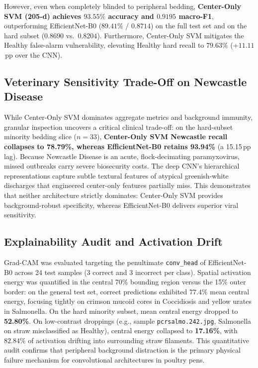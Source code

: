 \documentclass[conference]{IEEEtran}
\begin{document}
However, even when completely blinded to peripheral bedding, \textbf{Center-Only SVM (205-d) achieves $93.55\%$ accuracy and $0.9195$ macro-F1}, outperforming EfficientNet-B0 ($89.41\%$ / $0.8714$) on the full test set and on the hard subset ($0.8690$ vs.\ $0.8204$). Furthermore, Center-Only SVM mitigates the Healthy false-alarm vulnerability, elevating Healthy hard recall to $79.63\%$ ($+11.11$\,pp over the CNN).

\subsection{Veterinary Sensitivity Trade-Off on Newcastle Disease}
While Center-Only SVM dominates aggregate metrics and background immunity, granular inspection uncovers a critical clinical trade-off: on the hard-subset minority bedding slice ($n=33$), \textbf{Center-Only SVM Newcastle recall collapses to 78.79\%, whereas EfficientNet-B0 retains 93.94\%} (a 15.15\,pp lag). Because Newcastle Disease is an acute, flock-decimating paramyxovirus, missed outbreaks carry severe biosecurity costs. The deep CNN's hierarchical representations capture subtle textural features of atypical greenish-white discharges that engineered center-only features partially miss. This demonstrates that neither architecture strictly dominates: Center-Only SVM provides background-robust specificity, whereas EfficientNet-B0 delivers superior viral sensitivity.

\subsection{Explainability Audit and Activation Drift}
Grad-CAM was evaluated targeting the penultimate \texttt{conv\_head} of EfficientNet-B0 across 24 test samples (3 correct and 3 incorrect per class). Spatial activation energy was quantified in the central 70\% bounding region versus the 15\% outer border: on the general test set, correct predictions exhibited $77.4\%$ mean central energy, focusing tightly on crimson mucoid cores in Coccidiosis and yellow urates in Salmonella. On the hard minority subset, mean central energy dropped to \textbf{52.80\%}. On low-contrast droppings (e.g., sample \texttt{pcrsalmo.242.jpg}, Salmonella on straw misclassified as Healthy), central energy collapsed to \textbf{17.16\%}, with $82.84\%$ of activation drifting into surrounding straw filaments. This quantitative audit confirms that peripheral background distraction is the primary physical failure mechanism for convolutional architectures in poultry pens.
\end{document}
